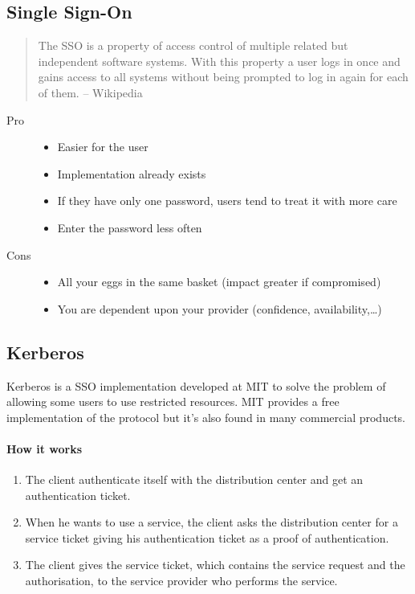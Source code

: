 \subsection{Single Sign-On}
\begin{quote}
The SSO is a property of access control of multiple related but independent
software systems. With this property a user logs in once and gains access to
all systems without being prompted to log in again for each of them.
-- Wikipedia
\end{quote}

\begin{description}
\item[Pro]
\hfill
\begin{itemize}
\item Easier for the user
\item Implementation already exists
\item If they have only one password, users tend to treat it with more care
\item Enter the password less often
\end{itemize}
\item[Cons]
\hfill
\begin{itemize}
\item All your eggs in the same basket (impact greater if compromised)
\item You are dependent upon your provider (confidence, availability,\ldots)
\end{itemize}
\end{description}

\subsection{Kerberos}
Kerberos is a SSO implementation developed at MIT to solve the problem of
allowing some users to use restricted resources. MIT provides a free
implementation of the protocol but it's also found in many commercial
products.

\paragraph{How it works}
\begin{enumerate}
\item The client authenticate itself with the distribution center and
  get an authentication ticket.
\item When he wants to use a service, the client asks the distribution center
  for a service ticket giving his authentication ticket as a proof of authentication.
\item The client gives the service ticket, which contains the service
  request and the authorisation, to the service provider who performs
  the service.
\end{enumerate}

